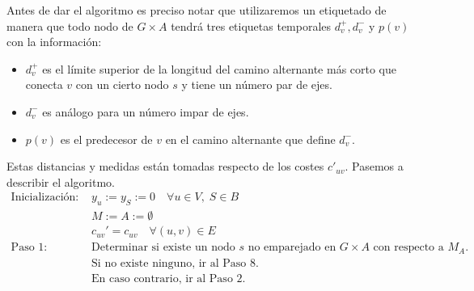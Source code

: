 \documentclass[twoside,a4paper,openright,12pt,tikz]{book}
\begin{document}
Antes de dar el algoritmo es preciso notar que utilizaremos un etiquetado de manera que todo nodo de $G\times A$ tendrá tres etiquetas temporales $d_v^+,d_v^-$ y $p(v)$ con la información:
\begin{itemize}
\item $d_v^+$ es el límite superior de la longitud del camino alternante más corto que conecta $v$ con un cierto nodo $s$ y tiene un número par de ejes.
\item $d_v^-$ es análogo para un número impar de ejes.
\item $p(v)$ es el predecesor de $v$ en el camino alternante que define $d_v^-$. 
\end{itemize}
Estas distancias y medidas están tomadas respecto de los costes $c'_{uv}$. Pasemos a describir el algoritmo.
\begin{align*}
\text{Inicialización: }& y_u:= y_S:= 0 \quad \forall u \in V,\; S\in B\\
& M:=A:=\emptyset\\
& c_{uv}' = c_{uv} \quad \forall (u,v)\in E\\
\text{Paso 1: }& \text{Determinar si existe un nodo $s$ no emparejado en $G\times A$ con respecto a $M_A$.}\\
&\text{Si no existe ninguno, ir al Paso 8.}\\
&\text{En caso contrario, ir al Paso 2.}
\end{align*}
\end{document}
